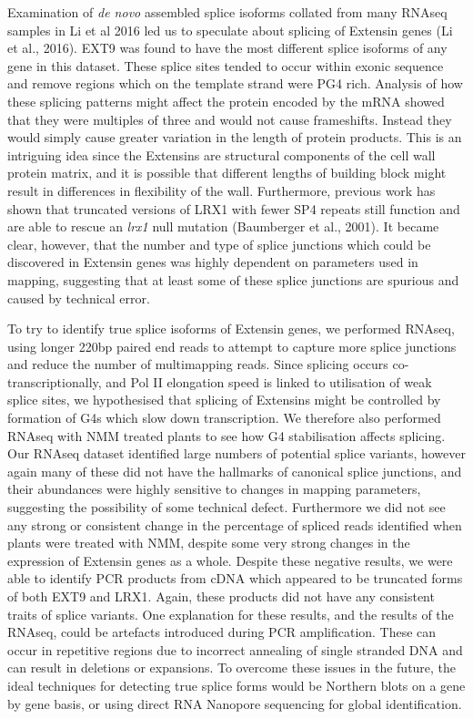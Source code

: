 \documentclass[12pt,a4paper,]{report}
\begin{document}
Examination of \emph{de novo} assembled splice isoforms collated from
many RNAseq samples in Li et al 2016 led us to speculate about splicing
of Extensin genes (Li et al., 2016). EXT9 was found to have the most
different splice isoforms of any gene in this dataset. These splice
sites tended to occur within exonic sequence and remove regions which on
the template strand were PG4 rich. Analysis of how these splicing
patterns might affect the protein encoded by the mRNA showed that they
were multiples of three and would not cause frameshifts. Instead they
would simply cause greater variation in the length of protein products.
This is an intriguing idea since the Extensins are structural components
of the cell wall protein matrix, and it is possible that different
lengths of building block might result in differences in flexibility of
the wall. Furthermore, previous work has shown that truncated versions
of LRX1 with fewer SP4 repeats still function and are able to rescue an
\emph{lrx1} null mutation (Baumberger et al., 2001). It became clear,
however, that the number and type of splice junctions which could be
discovered in Extensin genes was highly dependent on parameters used in
mapping, suggesting that at least some of these splice junctions are
spurious and caused by technical error.

To try to identify true splice isoforms of Extensin genes, we performed
RNAseq, using longer 220bp paired end reads to attempt to capture more
splice junctions and reduce the number of multimapping reads. Since
splicing occurs co-transcriptionally, and Pol II elongation speed is
linked to utilisation of weak splice sites, we hypothesised that
splicing of Extensins might be controlled by formation of G4s which slow
down transcription. We therefore also performed RNAseq with NMM treated
plants to see how G4 stabilisation affects splicing. Our RNAseq dataset
identified large numbers of potential splice variants, however again
many of these did not have the hallmarks of canonical splice junctions,
and their abundances were highly sensitive to changes in mapping
parameters, suggesting the possibility of some technical defect.
Furthermore we did not see any strong or consistent change in the
percentage of spliced reads identified when plants were treated with
NMM, despite some very strong changes in the expression of Extensin
genes as a whole. Despite these negative results, we were able to
identify PCR products from cDNA which appeared to be truncated forms of
both EXT9 and LRX1. Again, these products did not have any consistent
traits of splice variants. One explanation for these results, and the
results of the RNAseq, could be artefacts introduced during PCR
amplification. These can occur in repetitive regions due to incorrect
annealing of single stranded DNA and can result in deletions or
expansions. To overcome these issues in the future, the ideal techniques
for detecting true splice forms would be Northern blots on a gene by
gene basis, or using direct RNA Nanopore sequencing for global
identification.
\end{document}
